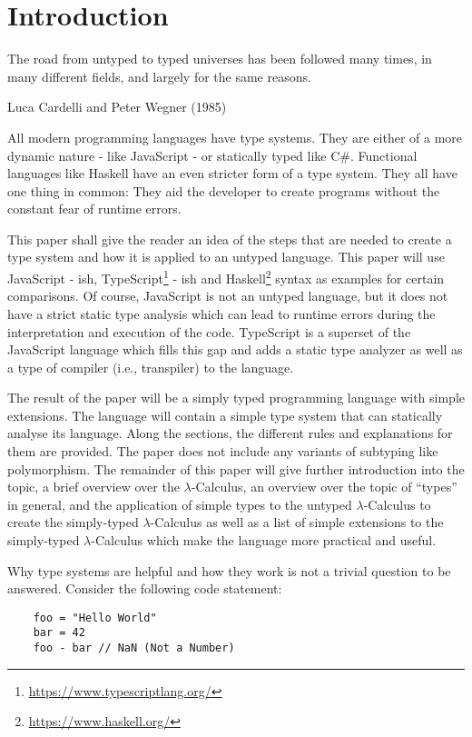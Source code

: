 \section{Introduction}

\epigraph{
    The road from untyped to typed universes has been followed many times,
    in many different fields, and largely for the same reasons.
}
{Luca Cardelli and Peter Wegner (1985)}

All modern programming languages have type systems.
They are either of a more dynamic nature - like JavaScript -
or statically typed like C\#. Functional languages like Haskell have
an even stricter form of a type system. They all have one thing in
common: They aid the developer to create programs without 
the constant fear of runtime errors.

This paper shall give the reader an idea of the steps that
are needed to create a type system and how it is applied to
an untyped language. This paper will use JavaScript - ish,
TypeScript\footnote{\url{https://www.typescriptlang.org/}} - ish
and Haskell\footnote{\url{https://www.haskell.org/}}
syntax as examples for certain comparisons.
Of course, JavaScript is not an untyped language, but
it does not have a strict static type analysis which can lead
to runtime errors during the interpretation and execution of the code.
TypeScript is a superset of the JavaScript language which fills this
gap and adds a static type analyzer as well as a type of compiler
(i.e., transpiler) to the language.

The result of the paper will be a simply typed programming language
with simple extensions. The language will contain a simple type
system that can statically analyse its language. Along the sections,
the different rules and explanations for them are provided. 
The paper does not include any variants of subtyping like polymorphism. The remainder
of this paper will give further introduction into the topic,
a brief overview over the $\lambda$-Calculus, an overview
over the topic of ``types'' in general, and the application
of simple types to the untyped $\lambda$-Calculus to create the
simply-typed $\lambda$-Calculus as well as a list of simple
extensions to the simply-typed $\lambda$-Calculus which make
the language more practical and useful.

Why type systems are helpful and how they work
is not a trivial question to be answered. Consider
the following code statement:

\begin{verbatim}
    foo = "Hello World"
    bar = 42
    foo - bar // NaN (Not a Number)
\end{verbatim}

